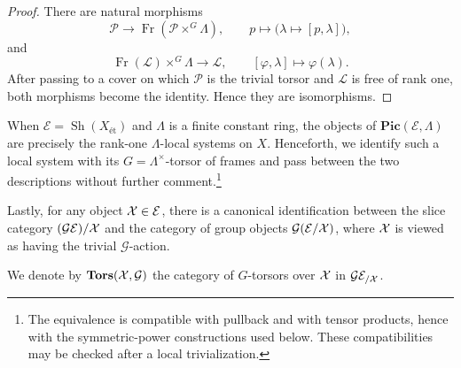 \begin{proof}
There are natural morphisms
\[
\mathcal{P}\longrightarrow
\operatorname{Fr}(\mathcal{P}\times^G\Lambda),
\qquad
p\longmapsto\bigl(\lambda\longmapsto[p,\lambda]\bigr),
\]
and
\[
\operatorname{Fr}(\mathcal{L})\times^G\Lambda
\longrightarrow\mathcal{L},
\qquad
[\varphi,\lambda]\longmapsto\varphi(\lambda).
\]
After passing to a cover on which $\mathcal{P}$ is the trivial torsor and
$\mathcal{L}$ is free of rank one, both morphisms become the identity.
Hence they are isomorphisms.
\end{proof}

When $\mathcal{E}=\operatorname{Sh}(X_{\text{\'et}})$ and $\Lambda$
is a finite constant ring, the objects of
$\mathbf{Pic}(\mathcal{E},\Lambda)$ are precisely the rank-one
$\Lambda$-local systems on $X$. Henceforth, we identify such a local system
with its $G=\Lambda^\times$-torsor of frames and pass between the two
descriptions without further comment.\footnote{The equivalence is compatible
with pullback and with tensor products, hence with the symmetric-power
constructions used below. These compatibilities may be checked after a local
trivialization.}

Lastly, for any object $\mathcal{X} \in \mathcal{E}$, there is a canonical identification between the slice category
$(\mathcal{G}\mathcal{E})/\mathcal{X}$ and the category of group objects $\mathcal{G}(\mathcal{E}/\mathcal{X})$, where $\mathcal{X}$ is viewed as having the 
trivial $\mathcal{G}$-action.

We denote by $\mathbf{Tors}(\mathcal{X}, \mathcal{G})$ the category of $G$-torsors over $\mathcal{X}$ in $\mathcal{G} \mathcal{E}_{/\mathcal{X}}$.


